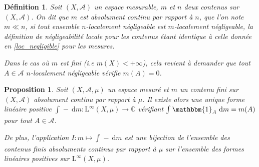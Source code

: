 \documentclass[a4paper,12pt]{article}
\newtheorem{proposition}[theorem]{Proposition}
\newtheorem{definition}[theorem]{Définition}
\newcommand{\C}{\mathbb{C}}
\newcommand{\indic}{\mathbbm{1}}
\newcommand{\integral}[4]{\int_{#1}^{#2} #3~\mathrm{d}#4}
\newcommand{\blank}{{-}}
\begin{document}
\begin{definition}
    Soit $(X, \mathcal{A})$ un espace mesurable, $m$ et $n$ deux contenus sur $(X, \mathcal{A})$.
    On dit que $m$ est \emph{absolument continu} par rapport à $n$, que l'on note $m \ll n$, si tout 
    ensemble $n$-localement négligeable est $m$-localement négligeable, la définition de négligeabilité 
    locale pour les contenus étant identique à celle donnée en \ref{loc_negligible} pour les mesures. 

    Dans le cas où $m$ est fini (i.e $m(X)<+\infty$), cela revient à demander que tout $A\in\mathcal{A}$
    $n$-localement négligeable vérifie $m(A) = 0$.
\end{definition}

\begin{proposition}\label{content_integration_and_repr}
    Soit $(X, \mathcal{A}, \mu)$ un espace mesuré et $m$ un contenu fini sur $(X, \mathcal{A})$ \emph{absolument continu par rapport
    à} $\mu$. Il existe alors une unique forme linéaire positive $\integral{}{}{\blank}{m} : \mathrm{L}^\infty(X, \mu)\to\C$ vérifiant $\integral{}{}{\indic_A}{m} = m(A)$ pour tout
    $A\in\mathcal{A}$. 

    De plus, l'application $I : m\mapsto \integral{}{}{\blank}{m}$ est une bijection de l'ensemble des contenus finis absoluments continus par rapport à $\mu$
    sur l'ensemble des formes linéaires positives sur $\mathrm{L}^\infty(X, \mu)$.
\end{proposition}
\end{document}
